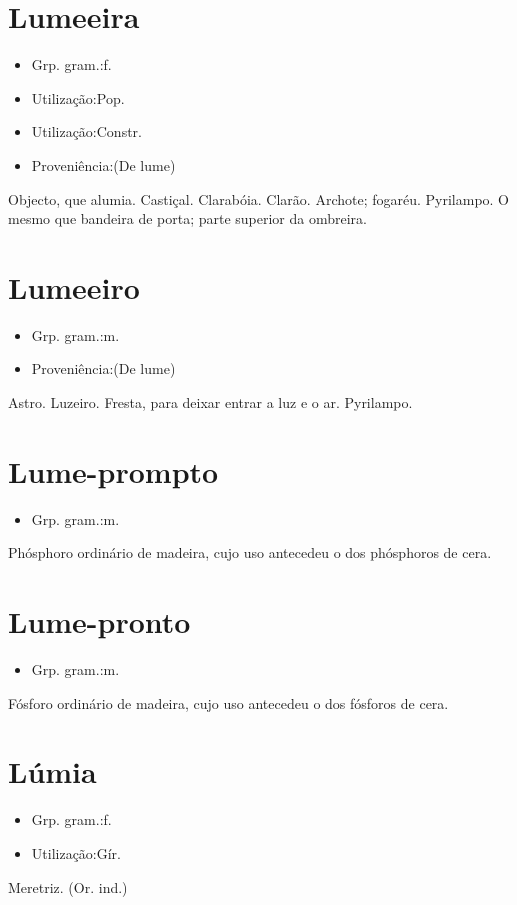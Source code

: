 \section{Lumeeira}
\begin{itemize}
\item {Grp. gram.:f.}
\end{itemize}
\begin{itemize}
\item {Utilização:Pop.}
\end{itemize}
\begin{itemize}
\item {Utilização:Constr.}
\end{itemize}
\begin{itemize}
\item {Proveniência:(De \textunderscore lume\textunderscore )}
\end{itemize}
Objecto, que alumia.
Castiçal.
Clarabóia.
Clarão.
Archote; fogaréu.
Pyrilampo.
O mesmo que bandeira de porta; parte superior da ombreira.
\section{Lumeeiro}
\begin{itemize}
\item {Grp. gram.:m.}
\end{itemize}
\begin{itemize}
\item {Proveniência:(De \textunderscore lume\textunderscore )}
\end{itemize}
Astro.
Luzeiro.
Fresta, para deixar entrar a luz e o ar.
Pyrilampo.
\section{Lume-prompto}
\begin{itemize}
\item {Grp. gram.:m.}
\end{itemize}
Phósphoro ordinário de madeira, cujo uso antecedeu o dos phósphoros de cera.
\section{Lume-pronto}
\begin{itemize}
\item {Grp. gram.:m.}
\end{itemize}
Fósforo ordinário de madeira, cujo uso antecedeu o dos fósforos de cera.
\section{Lúmia}
\begin{itemize}
\item {Grp. gram.:f.}
\end{itemize}
\begin{itemize}
\item {Utilização:Gír.}
\end{itemize}
Meretriz.
(Or. ind.)
